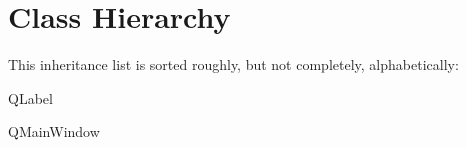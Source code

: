 \section{Class Hierarchy}
This inheritance list is sorted roughly, but not completely, alphabetically\-:\begin{DoxyCompactList}
\item Q\-Label\begin{DoxyCompactList}
\item {}
\item {}
\end{DoxyCompactList}
\item Q\-Main\-Window\begin{DoxyCompactList}
\item {}
\end{DoxyCompactList}
\item {}
\begin{DoxyCompactList}
\item {}
\end{DoxyCompactList}
\end{DoxyCompactList}
